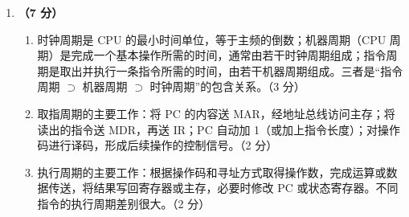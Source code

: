 \documentclass[a4paper,11pt]{article}
\begin{document}
\begin{enumerate}[start=1, label=\textbf{\arabic*.}, leftmargin=2.4em, itemsep=0.45em]
\item \textbf{（7 分）}
\begin{enumerate}[label=（\arabic*）, leftmargin=2.2em, itemsep=1pt]
  \item 时钟周期是 CPU 的最小时间单位，等于主频的倒数；机器周期（CPU 周期）是完成一个基本操作所需的时间，通常由若干时钟周期组成；指令周期是取出并执行一条指令所需的时间，由若干机器周期组成。三者是“指令周期 $\supset$ 机器周期 $\supset$ 时钟周期”的包含关系。\hfill（3 分）
  \item 取指周期的主要工作：将 PC 的内容送 MAR，经地址总线访问主存；将读出的指令送 MDR，再送 IR；PC 自动加 1（或加上指令长度）；对操作码进行译码，形成后续操作的控制信号。\hfill（2 分）
  \item 执行周期的主要工作：根据操作码和寻址方式取得操作数，完成运算或数据传送，将结果写回寄存器或主存，必要时修改 PC 或状态寄存器。不同指令的执行周期差别很大。\hfill（2 分）
\end{enumerate}

\end{enumerate}

\end{document}
